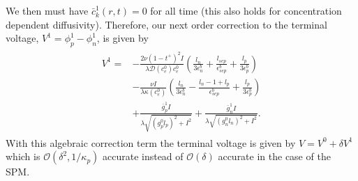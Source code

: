 \documentclass[preprint]{elsarticle}
\begin{document}
We then must have ${\bar{c}_k^1(r,t)=0}$ for all time (this also holds for concentration dependent diffusivity). Therefore, our next order correction to the terminal voltage, ${V^1=\phi_p^1-\phi_n^1}$, is given by
\begin{align}\label{eqn:voltageCorrection}
\begin{split} 
V^1 = &-\frac{2 \nu (1-t^+)^2I}{\lambda \mathcal{D}(c_e^0)c_e^0}\left( \frac{l_n}{3 \epsilon_n^b} + \frac{l_{sep}}{\epsilon_{sep}^b} + \frac{l_p}{3\epsilon_p^b} \right) \\ 
    & - \frac{\nu I}{\lambda \kappa(c_e^0)} \left(\frac{l_n}{3\epsilon_n^b} - \frac{l_n - 1 + l_p}{\epsilon_{sep}^b} + \frac{l_p}{3\epsilon_p^b} \right) \\
    &+ \frac{\bar{g}_p^1 I }{\lambda \sqrt{(g_p^0l_p)^2+I^2}} + \frac{\bar{g}_n^1 I }{\lambda \sqrt{(g_n^0l_n)^2+I^2}}.  
\end{split}
\end{align} 
With this algebraic correction term the terminal voltage is given by $V=V^0+\delta V^1$ which is $\mathcal{O}(\delta^2,1/\kappa_p)$ accurate instead of  $\mathcal{O}(\delta)$ accurate in the case of the SPM.
\end{document}
